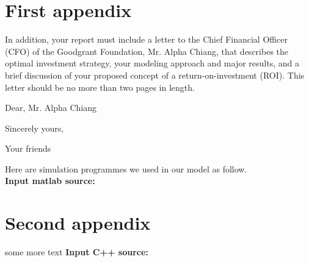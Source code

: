 \documentclass{mcmthesis}
\begin{document}
\begin{appendices}

\section{First appendix}

In addition, your report must include a letter to the Chief Financial Officer (CFO) of the Goodgrant Foundation, Mr. Alpha Chiang, that describes the optimal investment strategy, your modeling approach and major results, and a brief discussion of your proposed concept of a return-on-investment (ROI). This letter should be no more than two pages in length.

\begin{letter}{Dear, Mr. Alpha Chiang}

\lipsum[1-2]

\vspace{\parskip}

Sincerely yours,

Your friends

\end{letter}
Here are simulation programmes we used in our model as follow.\\

\textbf{\textcolor[rgb]{0.98,0.00,0.00}{Input matlab source:}}


\section{Second appendix}

some more text \textcolor[rgb]{0.98,0.00,0.00}{\textbf{Input C++ source:}}


\end{appendices}


\AImatter
\end{document}
